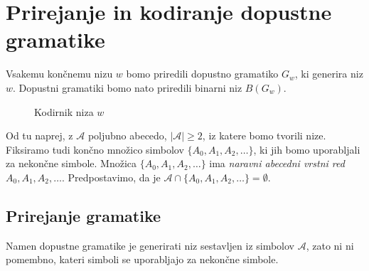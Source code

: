 \documentclass[fin1, tisk]{fmfdelo}
\providecommand{\abs}[1]{\left\lvert #1 \right\rvert}
\newcommand{\A}{\mathcal{A}}
\theoremstyle{definition}
\begin{document}
\section{Prirejanje in kodiranje dopustne gramatike} 

Vsakemu končnemu nizu $w$ bomo priredili dopustno gramatiko $G_w$, ki generira niz $w$. Dopustni
gramatiki bomo nato priredili binarni niz $B(G_w)$.

\begin{figure}[H]
    \centering
    \caption{Kodirnik niza $w$}
    \label{fig:Kodirnik}
\end{figure}

Od tu naprej, z $\A$ poljubno abecedo, $\abs{\A} \geq 2$, iz katere bomo tvorili nize. Fiksiramo tudi
končno množico simbolov $\{ A_0, A_1, A_2, \ldots \}$, ki jih bomo uporabljali za nekončne simbole.
Množica $\{ A_0, A_1, A_2, \ldots \}$ ima \emph{naravni abecedni vrstni red} $A_0, A_1, A_2, \ldots$.
Predpostavimo, da je $\A \cap \{ A_0, A_1, A_2, \ldots \} = \emptyset$.

\subsection{Prirejanje gramatike}

Namen dopustne gramatike je generirati niz sestavljen iz simbolov $\A$, zato ni ni pomembno, 
kateri simboli se uporabljajo za nekončne simbole.
\end{document}
